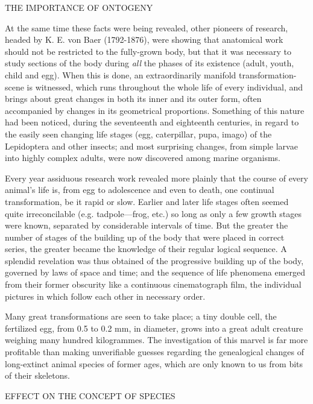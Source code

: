 THE IMPORTANCE OF ONTOGENY

At the same time these facts were being revealed, other pioneers of research, headed by K. E.
von Baer (1792-1876), were showing that anatomical work should not be restricted to the
fully-grown body, but that it was necessary to study sections of the body during \textit{all} the
phases of its existence (adult, youth, child and egg). When this is done, an extraordinarily
manifold transformation-scene is witnessed, which runs throughout the whole life of every
individual, and brings about great changes in both its inner and its outer form, often
accompanied by changes in its geometrical proportions. Something of this nature had been
noticed, during the seventeenth and eighteenth centuries, in regard to the easily seen
changing life stages (egg, caterpillar, pupa, imago) of the Lepidoptera and other insects; and
most surprising changes, from simple larvae into highly complex adults, were now
discovered among marine organisms.

Every year assiduous research work revealed more plainly that the course of every animal's
life is, from egg to adolescence and even to death, one continual transformation, be it rapid or
slow. Earlier and later life stages often seemed quite irreconcilable (e.g. tadpole—frog, etc.)
so long as only a few growth stages were known, separated by considerable intervals of time.
But the greater the number of stages of the building up of the body that were placed in
correct series, the greater became the knowledge of their regular logical sequence. A splendid
revelation was thus obtained of the progressive building up of the body, governed by laws of
space and time; and the sequence of life phenomena emerged from their former obscurity like
a continuous cinematograph film, the individual pictures in which follow each other in
necessary order.

Many great transformations are seen to take place; a tiny double cell, the fertilized egg, from
0.5 to 0.2 mm, in diameter, grows into a great adult creature weighing many hundred
kilogrammes. The investigation of this marvel is far more profitable than making
unverifiable guesses regarding the genealogical changes of long-extinct animal species of
former ages, which are only known to us from bits of their skeletons.

EFFECT ON THE CONCEPT OF SPECIES


